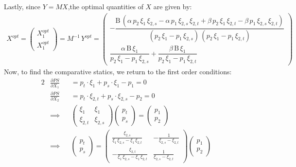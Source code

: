 \documentclass[12pt,a4paper]{extarticle}
\begin{document}
Lastly, since $Y = MX$,the optimal quantities of $X$ are given by:
\begin{align*}
X^{opt} = 
\begin{pmatrix}
X_1^{opt} \\
X_1^{opt} 
\end{pmatrix}
=
M^{-1} \, Y^{opt} = 
\begin{pmatrix}
-\dfrac{\mathrm{B}\,\left(\alpha \,p_{2}\,\xi _{1}\,\xi _{2,s}-\alpha \,p_{1}\,\xi _{2,s}\,\xi _{2,t}+\beta\,p_{2}\,\xi _{1}\,\xi _{2,t}-\beta\,p_{1}\,\xi _{2,s}\,\xi _{2,t}\right)}{\left(p_{2}\,\xi _{1}-p_{1}\,\xi _{2,s}\right)\,\left(p_{2}\,\xi _{1}-p_{1}\,\xi _{2,t}\right)}\\[3ex] 
\dfrac{\alpha \,\mathrm{B}\,\xi _{1}}{p_{2}\,\xi _{1}-p_{1}\,\xi _{2,s}}+\dfrac{\beta\,\mathrm{B}\,\xi _{1}}{p_{2}\,\xi _{1}-p_{1}\,\xi _{2,t}}
\end{pmatrix}
\end{align*}
Now, to find the comparative statics, we return to the first order conditions:
\begin{alignat*}{2}
&\frac{\partial PS}{\partial X_1} &&= p_t \cdot \xi_1  + p_s \cdot \xi_1 - p_1 = 0 \\
&\frac{\partial PS}{\partial X_2} &&= p_t \cdot \xi_{2,t}  + p_s \cdot \xi_{2,s} - p_2 = 0 \\ 
&\implies 
&&\begin{pmatrix}
\xi_1 & \xi_1 \\
\xi_{2,t} & \xi_{2,s} 
\end{pmatrix}
\begin{pmatrix}
p_t \\
p_s
\end{pmatrix}
=
\begin{pmatrix}
p_1 \\
p_2
\end{pmatrix} \\
&\implies 
&&
\begin{pmatrix}
p_t \\
p_s
\end{pmatrix}
=
\begin{pmatrix} 
\frac{\xi _{2,s}}{\xi _{1}\,\xi _{2,s}-\xi _{1}\,\xi _{2,t}} & -\frac{1}{\xi _{2,s}-\xi _{2,t}}\\ 
-\frac{\xi _{2,t}}{\xi _{1}\,\xi _{2,s}-\xi _{1}\,\xi _{2,t}} & \frac{1}{\xi _{2,s}-\xi _{2,t}} 
\end{pmatrix}
\begin{pmatrix}
p_1 \\
p_2
\end{pmatrix}
\end{alignat*}
\end{document}
